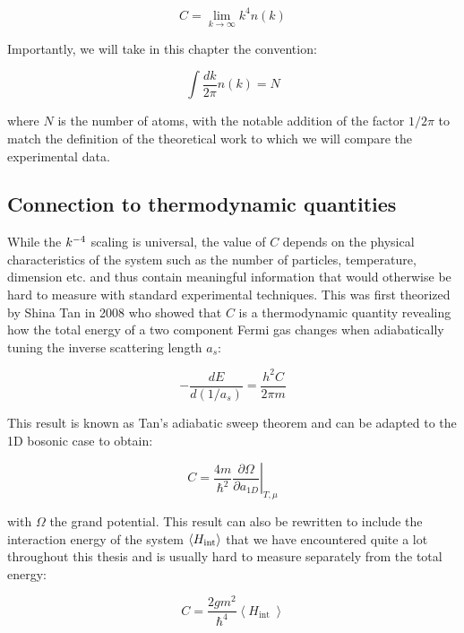 \begin{equation}
    C = \lim_{k \to \infty} k^4 n(k)
\end{equation}

Importantly, we will take in this chapter the convention:

\begin{equation}
    \int \frac{d k}{2 \pi} n(k)= N
\end{equation}

\noindent where $N$ is the number of atoms, with the notable addition of the factor $1/2 \pi$ to match the definition of the theoretical work \cite{yao2018tan} to which we will compare the experimental data.  

\subsection{Connection to thermodynamic quantities}

While the $k^{-4}$ scaling is universal, the value of $C$ depends on the physical characteristics of the system such as the number of particles, temperature, dimension etc. and thus contain meaningful information that would otherwise be hard to measure with standard experimental techniques. This was first theorized by Shina Tan in 2008 \cite{tan2008large} who showed that $C$ is a thermodynamic quantity revealing how the total energy of a two component Fermi gas changes when adiabatically tuning the inverse scattering length $a_s$:

\begin{equation}
    -\frac{d E}{d(1 / a_s)}=\frac{h^{2} C}{2 \pi m}
\end{equation}

\noindent This result is known as Tan's adiabatic sweep theorem and can be adapted to the 1D bosonic case \cite{barth2011tan} to obtain:

\begin{equation}
    C=\left.\frac{4 m}{\hbar^{2}} \frac{\partial \Omega}{\partial a_{1 D}}\right|_{T, \mu}
\end{equation}

\noindent with $\Omega$ the grand potential. This result can also be rewritten to include the interaction energy of the system $\left\langle H_{\rm{int}}\right\rangle$ that we have encountered quite a lot throughout this thesis and is usually hard to measure separately from the total energy:

\begin{equation}
    C=\frac{2 g m^{2}}{\hbar^{4}}\left\langle H_{\text {int }}\right\rangle
    \label{eq:C_with_int}
\end{equation}

